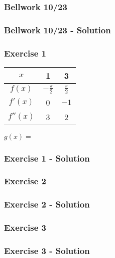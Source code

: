 \documentclass[12pt]{beamer}
\begin{document}
\begin{frame}
	\frametitle{Bellwork 10/23}
	\initclock

	
\end{frame}
\begin{frame}
	\frametitle{Bellwork 10/23 - Solution}

	
\end{frame}
\begin{frame}
	\frametitle{Exercise 1}

	\begin{tabular}{|c||c|c|} \hline
		$x$ & 1 & 3 \\ \hline
		$f(x)$ & $-\frac\pi2$ & $\frac\pi2$ \\ \hline
		$f'(x)$ & 0 & $-1$ \\ \hline
		$f''(x)$ & 3 & 2 \\ \hline
	\end{tabular}\par
	$g(x)=$
\end{frame}
\begin{frame}
	\frametitle{Exercise 1 - Solution}

	
\end{frame}
\begin{frame}
	\frametitle{Exercise 2}

	
\end{frame}
\begin{frame}
	\frametitle{Exercise 2 - Solution}

	
\end{frame}
\begin{frame}
	\frametitle{Exercise 3}

	
\end{frame}
\begin{frame}
	\frametitle{Exercise 3 - Solution}

	
\end{frame}
\end{document}
